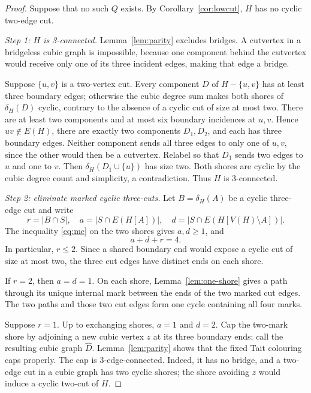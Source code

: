 \documentclass[11pt]{article}
\theoremstyle{definition}
\theoremstyle{remark}
\begin{document}
\begin{proof}
Suppose that no such \(Q\) exists.  By
Corollary~\ref{cor:lowcut}, \(H\) has no cyclic two-edge cut.

\smallskip
\noindent\emph{Step 1: \(H\) is 3-connected.}
Lemma~\ref{lem:parity} excludes bridges.  A cutvertex in a bridgeless
cubic graph is impossible, because one component behind the cutvertex
would receive only one of its three incident edges, making that edge a
bridge.

Suppose \(\{u,v\}\) is a two-vertex cut.  Every component \(D\) of
\(H-\{u,v\}\) has at least three boundary edges; otherwise the cubic
degree sum makes both shores of \(\delta_H(D)\) cyclic, contrary to the
absence of a cyclic cut of size at most two.  There are at least two
components and at most six boundary incidences at \(u,v\).  Hence
\(uv\notin E(H)\), there are exactly two components \(D_1,D_2\), and
each has three boundary edges.  Neither component sends all three edges
to only one of \(u,v\), since the other would then be a cutvertex.
Relabel so that \(D_1\) sends two edges to \(u\) and one to \(v\).
Then
\(\delta_H(D_1\cup\{u\})\) has size two.  Both shores are cyclic by the
cubic degree count and simplicity, a contradiction.  Thus \(H\) is
3-connected.

\smallskip
\noindent\emph{Step 2: eliminate marked cyclic three-cuts.}
Let \(B=\delta_H(A)\) be a cyclic three-edge cut and write
\[
 r=|B\cap S|,\quad
 a=|S\cap E(H[A])|,\quad
 d=|S\cap E(H[V(H)\setminus A])|.
\]
The inequality \eqref{eq:mc} on the two shores gives \(a,d\geq1\), and
\[
 a+d+r=4. \tag{4.1}\label{eq:marks-split}
\]
In particular, \(r\leq2\).  Since a shared boundary end would expose a
cyclic cut of size at most two, the three cut edges have distinct ends
on each shore.

If \(r=2\), then \(a=d=1\).  On each shore,
Lemma~\ref{lem:one-shore} gives a path through its unique internal mark
between the ends of the two marked cut edges.  The two paths and those
two cut edges form one cycle containing all four marks.

Suppose \(r=1\).  Up to exchanging shores, \(a=1\) and \(d=2\).  Cap
the two-mark shore by adjoining a new cubic vertex \(z\) at its three
boundary ends; call the resulting cubic graph \(\widehat D\).
Lemma~\ref{lem:parity} shows that the fixed Tait colouring caps
properly.  The cap is 3-edge-connected.  Indeed, it has no bridge, and
a two-edge cut in a cubic graph has two cyclic shores; the shore
avoiding \(z\) would induce a cyclic two-cut of \(H\).


\end{proof}
\end{document}
